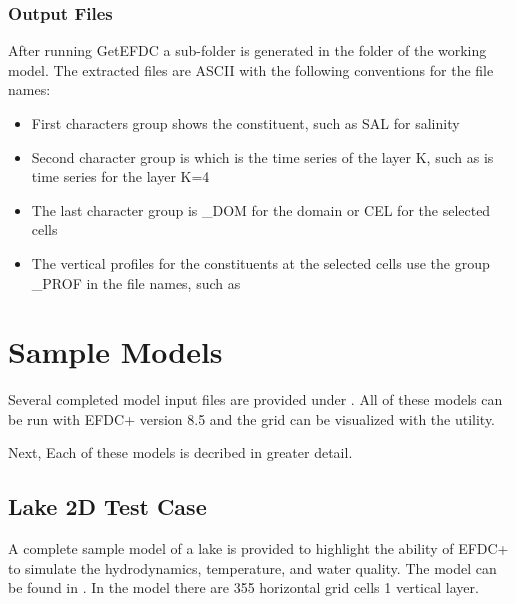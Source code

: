 \documentclass[letterpaper,10pt,english]{sphinxmanual}
\begin{document}
\subsubsection{Output Files}
\label{\detokenize{outputfiles/getefdc:output-files}}
After running GetEFDC a sub-folder  is generated in the folder  of the
working model. The extracted files are ASCII with the following conventions for the file
names:
\begin{itemize}
\item {} 
First characters group shows the constituent, such as SAL for salinity

\item {} 
Second character group is  which is the time series of the layer K, such as
 is time series for the layer K=4

\item {} 
The last character group is \_DOM for the domain or CEL for the selected cells

\item {} 
The vertical profiles for the constituents at the selected cells use the group \_PROF
in the file names, such as 

\end{itemize}


\section{Sample Models}
\label{\detokenize{samplemodels/index:sample-models}}\label{\detokenize{samplemodels/index:samplemodels}}\label{\detokenize{samplemodels/index::doc}}
Several completed model input files are provided under . All of these models can be run with EFDC+ version 8.5 and the grid can be visualized with the  utility.

Next, Each of these models is decribed in greater detail.


\subsection{Lake 2D Test Case}
\label{\detokenize{samplemodels/lake_2d_wq:lake-2d-test-case}}\label{\detokenize{samplemodels/lake_2d_wq:lake-2d-wq}}\label{\detokenize{samplemodels/lake_2d_wq::doc}}
A complete sample model of a lake is provided to highlight the ability of EFDC+ to simulate the hydrodynamics, temperature, and water quality.   The model can be found in .
In the model there are 355 horizontal grid cells 1 vertical layer.
\end{document}
